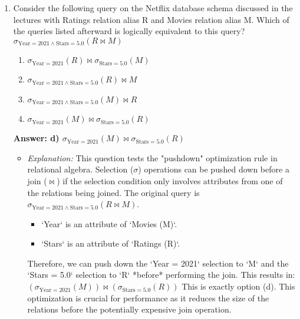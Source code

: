 \documentclass{article}
\begin{document}
\begin{enumerate}[label=\textbf{Question \arabic*.}]
\item Consider the following query on the Netflix database schema discussed in the lectures with Ratings relation alias R and Movies relation alias M. Which of the queries listed afterward is logically equivalent to this query?
    $\sigma_{\text{Year} = 2021 \wedge \text{Stars} = 5.0}(R \bowtie M)$
    \begin{enumerate}[label=\alph*)]
        \item $\sigma_{\text{Year} = 2021}(R) \bowtie \sigma_{\text{Stars} = 5.0}(M)$
        \item $\sigma_{\text{Year} = 2021 \wedge \text{Stars} = 5.0}(R) \bowtie M$
        \item $\sigma_{\text{Year} = 2021 \wedge \text{Stars} = 5.0}(M) \bowtie R$
        \item $\sigma_{\text{Year} = 2021}(M) \bowtie \sigma_{\text{Stars} = 5.0}(R)$
    \end{enumerate}
    \textbf{Answer: d) $\sigma_{\text{Year} = 2021}(M) \bowtie \sigma_{\text{Stars} = 5.0}(R)$}
    \begin{itemize}
        \item \textit{Explanation:} This question tests the "pushdown" optimization rule in relational algebra. Selection ($\sigma$) operations can be pushed down before a join ($\bowtie$) if the selection condition only involves attributes from one of the relations being joined.
        The original query is $\sigma_{\text{Year} = 2021 \wedge \text{Stars} = 5.0}(R \bowtie M)$.
        \begin{itemize}
            \item `Year` is an attribute of `Movies (M)`.
            \item `Stars` is an attribute of `Ratings (R)`.
        \end{itemize}
        Therefore, we can push down the `Year = 2021` selection to `M` and the `Stars = 5.0` selection to `R` *before* performing the join. This results in:
        $(\sigma_{\text{Year} = 2021}(M)) \bowtie (\sigma_{\text{Stars} = 5.0}(R))$
        This is exactly option (d). This optimization is crucial for performance as it reduces the size of the relations before the potentially expensive join operation.
    \end{itemize}


\end{enumerate}
\end{document}
